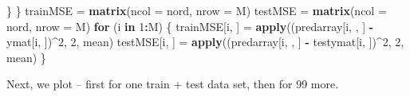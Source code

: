 \documentclass[]{article}
\newenvironment{Shaded}{\begin{snugshade}}{\end{snugshade}}
\newcommand{\ControlFlowTok}[1]{\textcolor[rgb]{0.13,0.29,0.53}{\textbf{#1}}}
\newcommand{\DataTypeTok}[1]{\textcolor[rgb]{0.13,0.29,0.53}{#1}}
\newcommand{\DecValTok}[1]{\textcolor[rgb]{0.00,0.00,0.81}{#1}}
\newcommand{\KeywordTok}[1]{\textcolor[rgb]{0.13,0.29,0.53}{\textbf{#1}}}
\newcommand{\NormalTok}[1]{#1}
\newcommand{\OperatorTok}[1]{\textcolor[rgb]{0.81,0.36,0.00}{\textbf{#1}}}
\newcommand{\StringTok}[1]{\textcolor[rgb]{0.31,0.60,0.02}{#1}}
\begin{document}
\begin{Shaded}
\begin{Highlighting}[]
\NormalTok{    \}}
\NormalTok{\}}
\NormalTok{trainMSE =}\StringTok{ }\KeywordTok{matrix}\NormalTok{(}\DataTypeTok{ncol =}\NormalTok{ nord, }\DataTypeTok{nrow =}\NormalTok{ M)}
\NormalTok{testMSE =}\StringTok{ }\KeywordTok{matrix}\NormalTok{(}\DataTypeTok{ncol =}\NormalTok{ nord, }\DataTypeTok{nrow =}\NormalTok{ M)}
\ControlFlowTok{for}\NormalTok{ (i }\ControlFlowTok{in} \DecValTok{1}\OperatorTok{:}\NormalTok{M) \{}
\NormalTok{    trainMSE[i, ] =}\StringTok{ }\KeywordTok{apply}\NormalTok{((predarray[i, , ] }\OperatorTok{-}\StringTok{ }\NormalTok{ymat[i, ])}\OperatorTok{^}\DecValTok{2}\NormalTok{, }\DecValTok{2}\NormalTok{, mean)}
\NormalTok{    testMSE[i, ] =}\StringTok{ }\KeywordTok{apply}\NormalTok{((predarray[i, , ] }\OperatorTok{-}\StringTok{ }\NormalTok{testymat[i, ])}\OperatorTok{^}\DecValTok{2}\NormalTok{, }\DecValTok{2}\NormalTok{, mean)}
\NormalTok{\}}
\end{Highlighting}
\end{Shaded}

Next, we plot -- first for one train + test data set, then for 99 more.
\end{document}
